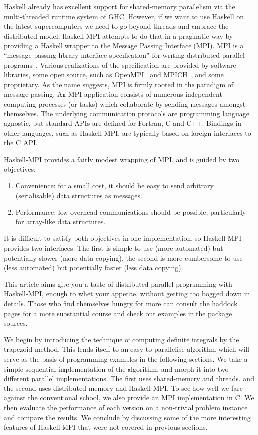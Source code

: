 \documentclass{tmr}
\begin{document}
Haskell already has excellent support for shared-memory parallelism via the multi-threaded runtime
system of GHC. However, if we want to use Haskell on the latest supercomputers we need to go beyond
threads and embrace the distributed model. Haskell-MPI attempts to do that in a pragmatic way by
providing a Haskell wrapper to the Message Passing Interface (MPI). MPI is a ``message-passing library interface specification''
for writing distributed-parallel programs~\cite{mpi-report}. Various realizations of the
specification are provided by software libraries, some open source,
such as OpenMPI~\cite{open-mpi} and MPICH~\cite{mpich}, and some proprietary.
As the name suggests, MPI is firmly rooted in the paradigm of message passing.
An MPI application consists of numerous independent computing processes (or tasks)
which collaborate by sending messages amongst themselves.
The underlying communication protocols are programming language agnostic, but standard APIs are
defined for Fortran, C and C++. Bindings in other languages, such as Haskell-MPI,
are typically based on foreign interfaces to the C API.

Haskell-MPI provides a fairly modest wrapping of MPI, and is guided by two objectives:
\begin{enumerate}
 \item Convenience: for a small cost, it should be easy to send arbitrary (serialisable)
data structures as messages.
 \item Performance: low overhead communications should be possible,
particularly for array-like data structures.
\end{enumerate}
It is difficult to satisfy both objectives in one implementation, so Haskell-MPI provides two interfaces.
The first is simple to use (more automated) but potentially slower (more data copying), the second
is more cumbersome to use (less automated) but potentially faster (less data copying).

This article aims give you a taste of distributed parallel programming with Haskell-MPI, enough to
whet your appetite, without getting too bogged down in details. Those who find themselves hungry for
more can consult the haddock pages for a more substantial course and check out examples in the package sources.

We begin by introducing the technique of computing definite integrals by the trapezoid method.
This lends itself to an easy-to-parallelise algorithm which will serve as the
basis of programming examples in the following sections. We take a simple sequential implementation
of the algorithm, and morph it into two different parallel implementations.
The first uses shared-memory and threads, and the second uses distributed-memory and Haskell-MPI.
To see how well we fare against the conventional school, we also provide an MPI implementation in C.
We then evaluate the performance of each version on a non-trivial problem instance and compare the results.
We conclude by discussing some of the more interesting features of Haskell-MPI that were not covered in
previous sections.
\end{document}
